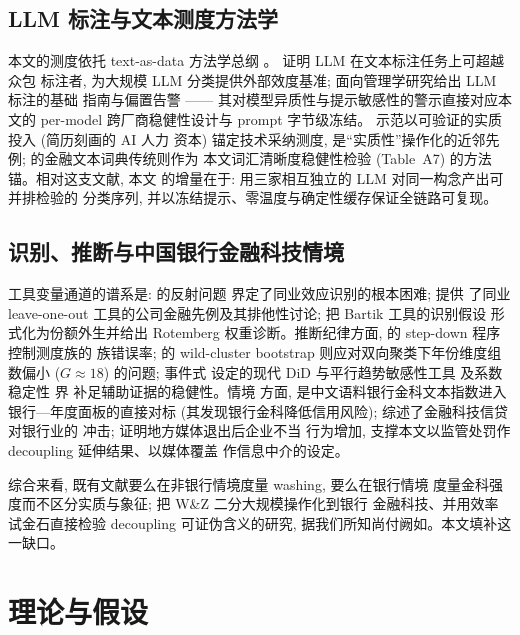 \subsection{LLM 标注与文本测度方法学}

本文的测度依托 text-as-data 方法学总纲 \parencite{gentzkow2019text}。
\textcite{gilardi2023chatgpt} 证明 LLM 在文本标注任务上可超越众包
标注者, 为大规模 LLM 分类提供外部效度基准;
\textcite{carlsonburbano2026llm} 面向管理学研究给出 LLM 标注的基础
指南与偏置告警 —— 其对模型异质性与提示敏感性的警示直接对应本文的
per-model 跨厂商稳健性设计与 prompt 字节级冻结。
\textcite{babina2024ai} 示范以可验证的实质投入 (简历刻画的 AI 人力
资本) 锚定技术采纳测度, 是``实质性''操作化的近邻先例;
\textcite{loughranmcdonald2011liability} 的金融文本词典传统则作为
本文词汇清晰度稳健性检验 (Table~A7) 的方法锚。相对这支文献, 本文
的增量在于: 用三家相互独立的 LLM 对同一构念产出可并排检验的
分类序列, 并以冻结提示、零温度与确定性缓存保证全链路可复现。

\subsection{识别、推断与中国银行金融科技情境}

工具变量通道的谱系是: \textcite{manski1993reflection} 的反射问题
界定了同业效应识别的根本困难; \textcite{learyroberts2014peer} 提供
了同业 leave-one-out 工具的公司金融先例及其排他性讨论;
\textcite{goldsmithpinkham2020bartik} 把 Bartik 工具的识别假设
形式化为份额外生并给出 Rotemberg 权重诊断。推断纪律方面,
\textcite{romanowolf2005stepwise} 的 step-down 程序控制测度族的
族错误率; \textcite{roodman2019boottest} 的 wild-cluster bootstrap
则应对双向聚类下年份维度组数偏小 ($G\approx18$) 的问题; 事件式
设定的现代 DiD 与平行趋势敏感性工具
\parencite{callaway2021difference,rambachan2023more} 及系数稳定性
界 \parencite{oster2019unobservable} 补足辅助证据的稳健性。情境
方面, \textcite{chengqu2020fintech} 是中文语料银行金科文本指数进入
银行—年度面板的直接对标 (其发现银行金科降低信用风险);
\textcite{berg2022fintechlending} 综述了金融科技信贷对银行业的
冲击; \textcite{heese2022newspaper} 证明地方媒体退出后企业不当
行为增加, 支撑本文以监管处罚作 decoupling 延伸结果、以媒体覆盖
作信息中介的设定。

综合来看, 既有文献要么在非银行情境度量 washing, 要么在银行情境
度量金科强度而不区分实质与象征; 把 W\&Z 二分大规模操作化到银行
金融科技、并用效率试金石直接检验 decoupling 可证伪含义的研究,
据我们所知尚付阙如。本文填补这一缺口。

\section{理论与假设}\label{sec:theory}

